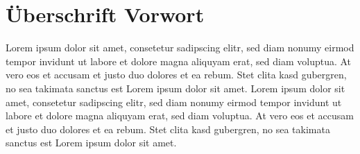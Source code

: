 %



\chapter{Überschrift Vorwort}

Lorem ipsum dolor sit amet, consetetur sadipscing elitr, sed diam nonumy eirmod tempor invidunt ut labore et dolore magna aliquyam erat, sed diam voluptua. At vero eos et accusam et justo duo dolores et ea rebum. Stet clita kasd gubergren, no sea takimata sanctus est Lorem ipsum dolor sit amet. Lorem ipsum dolor sit amet, consetetur sadipscing elitr, sed diam nonumy eirmod tempor invidunt ut labore et dolore magna aliquyam erat, sed diam voluptua. At vero eos et accusam et justo duo dolores et ea rebum. Stet clita kasd gubergren, no sea takimata sanctus est Lorem ipsum dolor sit amet.
\bigskip





